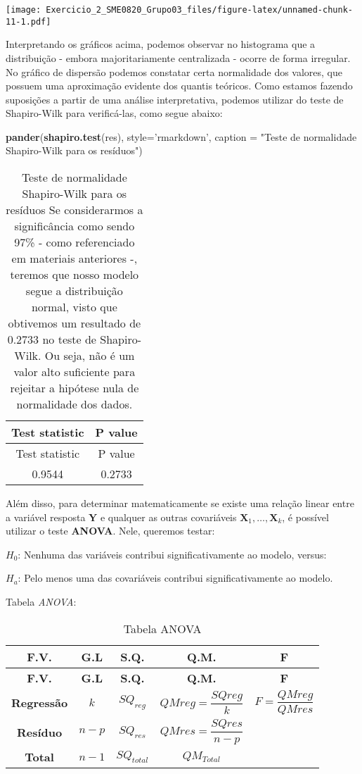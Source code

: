 \documentclass[
]{article}
\newenvironment{Shaded}{\begin{snugshade}}{\end{snugshade}}
\newcommand{\DataTypeTok}[1]{\textcolor[rgb]{0.13,0.29,0.53}{#1}}
\newcommand{\KeywordTok}[1]{\textcolor[rgb]{0.13,0.29,0.53}{\textbf{#1}}}
\newcommand{\NormalTok}[1]{#1}
\newcommand{\StringTok}[1]{\textcolor[rgb]{0.31,0.60,0.02}{#1}}
\begin{document}
\texttt{[image: Exercicio\_2\_SME0820\_Grupo03\_files/figure-latex/unnamed-chunk-11-1.pdf]}

Interpretando os gráficos acima, podemos observar no histograma que a
distribuição - embora majoritariamente centralizada - ocorre de forma
irregular. No gráfico de dispersão podemos constatar certa normalidade
dos valores, que possuem uma aproximação evidente dos quantis teóricos.
Como estamos fazendo suposições a partir de uma análise interpretativa,
podemos utilizar do teste de Shapiro-Wilk para verificá-las, como segue
abaixo:

\begin{Shaded}
\begin{Highlighting}[]
\KeywordTok{pander}\NormalTok{(}\KeywordTok{shapiro.test}\NormalTok{(res), }\DataTypeTok{style=}\StringTok{'rmarkdown'}\NormalTok{,}
       \DataTypeTok{caption =} \StringTok{"Teste de normalidade Shapiro-Wilk para os resíduos"}\NormalTok{)}
\end{Highlighting}
\end{Shaded}

\begin{longtable}[]{@{}cc@{}}
\caption{Teste de normalidade Shapiro-Wilk para os resíduos Se
considerarmos a significância como sendo 97\% - como referenciado em
materiais anteriores -, teremos que nosso modelo segue a distribuição
normal, visto que obtivemos um resultado de 0.2733 no teste de
Shapiro-Wilk. Ou seja, não é um valor alto suficiente para rejeitar a
hipótese nula de normalidade dos dados.}\tabularnewline
\toprule
Test statistic & P value\tabularnewline
\midrule
\endfirsthead
\toprule
Test statistic & P value\tabularnewline
\midrule
\endhead
0.9544 & 0.2733\tabularnewline
\bottomrule
\end{longtable}

Além disso, para determinar matematicamente se existe uma relação linear
entre a variável resposta \(\boldsymbol{Y}\) e qualquer as outras
covariáveis \(\boldsymbol{X}_1,\ldots,\boldsymbol{X}_k\), é possível
utilizar o teste \textbf{ANOVA}. Nele, queremos testar:

\textbf{\(H_0\)}: Nenhuma das variáveis contribui significativamente ao
modelo, versus:

\textbf{\(H_a\)}: Pelo menos uma das covariáveis contribui
significativamente ao modelo.

Tabela \emph{ANOVA}:

\begin{longtable}[]{@{}ccccc@{}}
\caption{Tabela ANOVA}\tabularnewline
\toprule
\textbf{F.V.} & \textbf{G.L} & \textbf{S.Q.} & \textbf{Q.M.} &
\textbf{F}\tabularnewline
\midrule
\endfirsthead
\toprule
\textbf{F.V.} & \textbf{G.L} & \textbf{S.Q.} & \textbf{Q.M.} &
\textbf{F}\tabularnewline
\midrule
\endhead
\textbf{Regressão} & \(k\) & \(SQ_{reg}\) & \(QMreg=\dfrac{SQreg}{k}\) &
\(F=\dfrac{QMreg}{QMres}\)\tabularnewline
\textbf{Resíduo} & \(n-p\) & \(SQ_{res}\) & \(QMres=\dfrac{SQres}{n-p}\)
&\tabularnewline
\textbf{Total} & \(n-1\) & \(SQ_{total}\) & \(QM_{Total}\)
&\tabularnewline
\bottomrule
\end{longtable}
\end{document}
